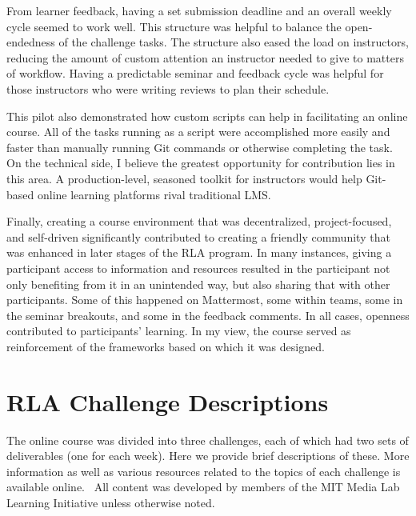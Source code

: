 \documentclass[12pt,twoside]{mitthesis}
\begin{document}
{From learner feedback, having a set submission deadline and an overall weekly cycle seemed to work well. This structure was helpful to balance the open-endedness of the challenge tasks. The structure also eased the load on instructors, reducing the amount of custom attention an instructor needed to give to matters of workflow. Having a predictable seminar and feedback cycle was helpful for those instructors who were writing reviews to plan their schedule.

This pilot also demonstrated how custom scripts can help in facilitating an online course. All of the tasks running as a script were accomplished more easily and faster than manually running Git commands or otherwise completing the task. On the technical side, I believe the greatest opportunity for contribution lies in this area. A production-level, seasoned toolkit for instructors would help Git-based online learning platforms rival traditional LMS.

Finally, creating a course environment that was decentralized, project-focused, and self-driven significantly contributed to creating a friendly community that was enhanced in later stages of the RLA program. In many instances, giving a participant access to information and resources resulted in the participant not only benefiting from it in an unintended way, but also sharing that with other participants. Some of this happened on Mattermost, some within teams, some in the seminar breakouts, and some in the feedback comments. In all cases, openness contributed to participants' learning. In my view, the course served as reinforcement of the frameworks based on which it was designed.}

\appendix

\chapter{RLA Challenge Descriptions}

The online course was divided into three challenges, each of which had two sets of deliverables (one for each week). Here we provide brief descriptions of these. More information as well as various resources related to the topics of each challenge is available online.~\cite{rla} All content was developed by members of the MIT Media Lab Learning Initiative unless otherwise noted.
\end{document}
